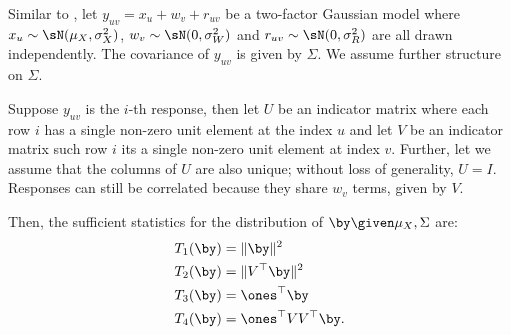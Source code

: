 \begin{lemma}%
\label{lem:suff-stats-two-factor-restricted}

  Similar to ,
  let $y_{uv} = x_u + w_v + r_{uv}$ be a two-factor Gaussian model where $x_u \sim \sN(\mu_X, \sigma_X^2)$, $w_v \sim \sN(0, \sigma_W^2)$ and $r_{uv} \sim \sN(0, \sigma_{R}^2)$ are all drawn independently.
  The covariance of $y_{uv}$ is given by $\Sigma$. 
  We assume further structure on $\Sigma$.

  Suppose $y_{uv}$ is the $i$-th response, then
  let $U$ be an indicator matrix where each row $i$ has a single non-zero unit element at the index $u$ and let $V$ be an indicator matrix such row $i$ its a single non-zero unit element at index $v$.
  Further, let we assume that the columns of $U$ are also unique; without loss of generality, $U = I$.
  Responses can still be correlated because they share $w_v$ terms, given by $V$.

  Then, the sufficient statistics for the distribution of $\by \given \mu_X, \Sigma$ are:
  \begin{align*}
    T_1(\by) &= \|\by\|^2 \\
    T_2(\by) &= \|V^\top \by\|^2 \\
    T_3(\by) &= \ones^\top \by \\
    T_4(\by) &= \ones^\top V V^\top \by.
  \end{align*}
\end{lemma}

